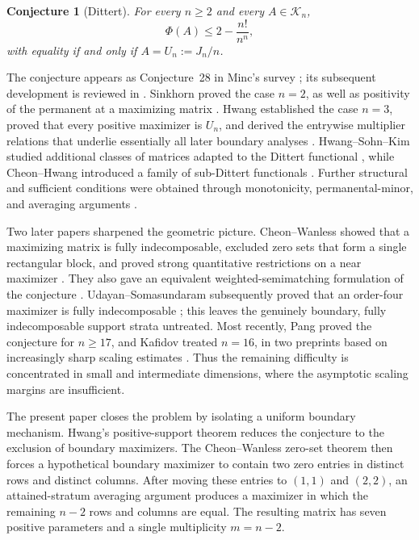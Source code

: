 \documentclass[11pt]{amsart}
\newtheorem{conjecture}[theorem]{Conjecture}
\theoremstyle{definition}
\theoremstyle{remark}
\begin{document}
\begin{conjecture}[Dittert]\label{conj:dittert}
For every \(n\geq2\) and every \(A\in\mathcal K_n\),
\[
 \Phi(A)\leq 2-\frac{n!}{n^n},
\]
with equality if and only if \(A=U_n:=J_n/n\).
\end{conjecture}

The conjecture appears as Conjecture~28 in Minc's survey
\cite{Minc83}; its subsequent development is reviewed in
\cite{CW05}.  Sinkhorn proved the case \(n=2\), as well as positivity of
the permanent at a maximizing matrix \cite{Sinkhorn}.  Hwang established
the case \(n=3\), proved that every positive maximizer is \(U_n\), and
derived the entrywise multiplier relations that underlie essentially all
later boundary analyses \cite{HwangDittert,Hwang87}.  Hwang--Sohn--Kim
studied additional classes of matrices adapted to the Dittert functional
\cite{HSK90}, while Cheon--Hwang introduced a family of sub-Dittert
functionals \cite{CH92}.  Further structural and sufficient conditions
were obtained through monotonicity, permanental-minor, and averaging
arguments \cite{Cheon93,CY}.

Two later papers sharpened the geometric picture.  Cheon--Wanless showed
that a maximizing matrix is fully indecomposable, excluded zero sets that
form a single rectangular block, and proved strong quantitative
restrictions on a near maximizer \cite{CW}.  They also gave an equivalent
weighted-semimatching formulation of the conjecture
\cite{CW07}.  Udayan--Somasundaram subsequently proved that an order-four
maximizer is fully indecomposable \cite{US24}; this leaves the genuinely
boundary, fully indecomposable support strata untreated.  Most recently,
Pang proved the conjecture for \(n\geq17\), and Kafidov treated
\(n=16\), in two preprints based on increasingly sharp scaling estimates
\cite{Pang,Kafidov}.  Thus the remaining difficulty is concentrated in
small and intermediate dimensions, where the asymptotic scaling margins
are insufficient.

The present paper closes the problem by isolating a uniform boundary
mechanism.  Hwang's positive-support theorem reduces the conjecture to the
exclusion of boundary maximizers.  The Cheon--Wanless zero-set theorem then
forces a hypothetical boundary maximizer to contain two zero entries in
distinct rows and distinct columns.  After moving these entries to
\((1,1)\) and \((2,2)\), an attained-stratum averaging argument produces a
maximizer in which the remaining \(n-2\) rows and columns are equal.  The
resulting matrix has seven positive parameters and a single multiplicity
\(m=n-2\).
\end{document}
